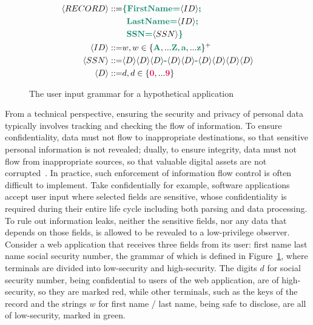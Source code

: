 \begin{figure}[tbp]
  \small
  \begin{align*}
    \langle RECORD \rangle ::= & {\color{green} \textbf{\{FirstName=}} \langle ID \rangle {\color{green} \textbf{;}} \\
                               & \enspace {\color{green} \textbf{LastName=}} \langle ID \rangle {\color{green} \textbf{;}} \\
                               & \enspace {\color{green} \textbf{SSN=}} \langle SSN \rangle {\color{green} \textbf{\}}} \\
    \langle ID \rangle     ::= & w , w \in \{ {\color{green} \textbf{A}}, ... {\color{green} \textbf{Z}}, {\color{green} \textbf{a}}, ... {\color{green} \textbf{z}} \}^{+} \\
    \langle SSN \rangle    ::= & \langle D \rangle \langle D \rangle \langle D \rangle {\color{green} \textbf{-}}
                                 \langle D \rangle \langle D \rangle {\color{green} \textbf{-}}
                                 \langle D \rangle \langle D \rangle \langle D \rangle \langle D \rangle \\
    \langle D \rangle      ::= & d , d \in \{ {\color{red} \textbf{0}}, ... {\color{red} \textbf{9}} \}
  \end{align*}
  \caption{The user input grammar for a hypothetical application}
  \label{fig:grammar}
\end{figure}

From a technical perspective, ensuring the security and privacy of
personal data typically involves tracking and checking
the flow of information. To ensure confidentiality, data must not
flow to inappropriate destinations, so that sensitive personal information
is not revealed; dually, to ensure integrity, data must not flow from
inappropriate sources, so that valuable digital assets are not
corrupted~\cite{sabelfeld2003language,biba1977integrity}.
In practice, such enforcement of information flow control is often difficult
to implement. Take confidentially for example, software applications accept
user input where selected fields are sensitive, whose confidentiality is required
during their entire life cycle including both parsing and data processing.
To rule out information leaks, neither the sensitive fields, nor any data that depends on
those fields, is allowed to be revealed to a low-privilege observer.
Consider a web application that receives three fields from its user:
 first name  last name 
social security number, the grammar of which
is defined in Figure~\ref{fig:grammar}, where terminals are divided into
low-security and high-security.
The digits $d$ for social security number, being confidential to users of
the web application, are of high-security, so they are marked {\color{red}
  red}, while other terminals, such as the keys of the record and the
strings $w$ for first name / last name, being safe to disclose, are
all of low-security, marked in {\color{green} green}.

